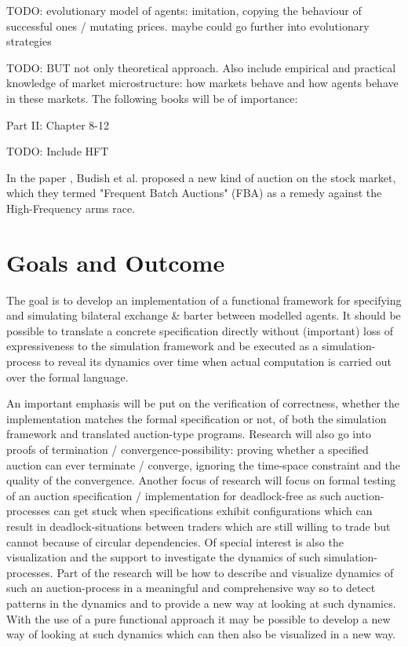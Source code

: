 \documentclass{article}
\begin{document}
\bigskip

TODO: evolutionary model of agents: imitation, copying the behaviour of successful ones / mutating prices. maybe could go further into evolutionary strategies

\bigskip

TODO: BUT not only theoretical approach. Also include empirical and practical knowledge of market microstructure: how markets behave and how agents behave in these markets. The following books will be of importance: \cite{LehalleLaruelle2013}

\cite{baker_market_2013} Part II: Chapter 8-12

\cite{aldridge_high_frequency_2009}

\bigskip

TODO: Include HFT

In the paper \cite{Budish2015}, Budish et al. proposed a new kind of auction on the stock market, which they termed "Frequent Batch Auctions" (FBA) as a remedy against the High-Frequency arms race. 


\section{Goals and Outcome}
The goal is to develop an implementation of a functional framework for specifying and simulating bilateral exchange \& barter between modelled agents. It should be possible to translate a concrete specification directly without (important) loss of expressiveness to the simulation framework and be executed as a simulation-process to reveal its dynamics over time when actual computation is carried out over the formal language.

\bigskip

An important emphasis will be put on the verification of correctness, whether the implementation matches the formal specification or not, of both the simulation framework and translated auction-type programs.
Research will also go into proofs of termination / convergence-possibility: proving whether a specified auction can ever terminate / converge, ignoring the time-space constraint and the quality of the convergence. Another focus of research will focus on formal testing of an auction specification / implementation for deadlock-free as such auction-processes can get stuck when specifications exhibit configurations which can result in deadlock-situations between traders which are still willing to trade but cannot because of circular dependencies.
Of special interest is also the visualization and the support to investigate the dynamics of such simulation-processes. Part of the research will be how to describe and visualize dynamics of such an auction-process in a meaningful and comprehensive way so to detect patterns in the dynamics and to provide a new way at looking at such dynamics. With the use of a pure functional approach it may be possible to develop a new way of looking at such dynamics which can then also be visualized in a new way.
\end{document}

